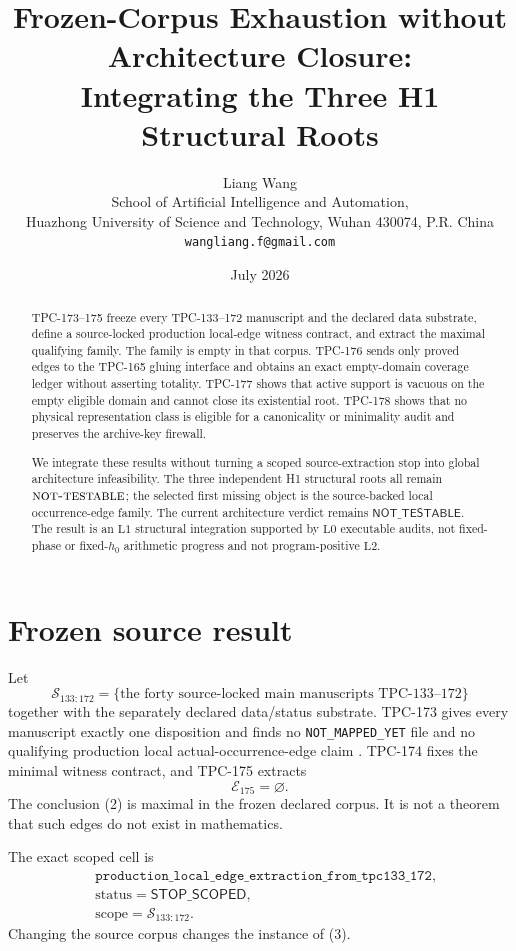 \documentclass[11pt]{article}
\title{\textbf{Frozen-Corpus Exhaustion without Architecture Closure:}\\
\textbf{Integrating the Three H1 Structural Roots}}
\author{Liang Wang\\
School of Artificial Intelligence and Automation,\\
Huazhong University of Science and Technology, Wuhan 430074, P.R. China\\
\texttt{wangliang.f@gmail.com}}
\date{July 2026}
\theoremstyle{definition}
\theoremstyle{remark}
\newcommand{\Lzero}{\mathrm{L0}}
\newcommand{\Lone}{\mathrm{L1}}
\newcommand{\Ltwo}{\mathrm{L2}}
\newcommand{\NT}{\textnormal{\textsc{not-testable}}}
\begin{document}
\maketitle

\begin{abstract}
TPC-173--175 freeze every TPC-133--172 manuscript and the declared
data substrate, define a source-locked production local-edge witness
contract, and extract the maximal qualifying family.  The family is
empty in that corpus.  TPC-176 sends only proved edges to the
TPC-165 gluing interface and obtains an exact empty-domain coverage
ledger without asserting totality.  TPC-177 shows that active support
is vacuous on the empty eligible domain and cannot close its
existential root.  TPC-178 shows that no physical representation
class is eligible for a canonicality or minimality audit and preserves
the archive-key firewall.

We integrate these results without turning a scoped source-extraction
stop into global architecture infeasibility.  The three independent
H1 structural roots all remain \(\NT\); the selected first missing
object is the source-backed local occurrence-edge family.  The
current architecture verdict remains \(\mathsf{NOT\_TESTABLE}\).
The result is an \(\Lone\) structural integration supported by
\(\Lzero\) executable audits, not fixed-phase or fixed-\(h_0\)
arithmetic progress and not program-positive \(\Ltwo\).
\end{abstract}

\section{Frozen source result}

Let
\[
 \mathcal S_{133:172}
 =\{\text{the forty source-locked main manuscripts TPC-133--172}\}
                                                                    \tag{1}
\]
together with the separately declared data/status substrate.
TPC-173 gives every manuscript exactly one disposition and finds no
\texttt{NOT\_MAPPED\_YET} file and no qualifying production local
actual-occurrence-edge claim \cite{WangTPC173}.  TPC-174 fixes the
minimal witness contract, and TPC-175 extracts
\[
 \mathcal E_{175}=\varnothing.                                    \tag{2}
\]
The conclusion (2) is maximal in the frozen declared corpus.  It is
not a theorem that such edges do not exist in mathematics.

The exact scoped cell is
\[
\begin{split}
 &\texttt{production\_local\_edge\_extraction\_from\_tpc133\_172},\\
 &\text{status}=\mathsf{STOP\_SCOPED},\\
 &\text{scope}=\mathcal S_{133:172}.
\end{split}                                                       \tag{3}
\]
Changing the source corpus changes the instance of (3).
\end{document}
